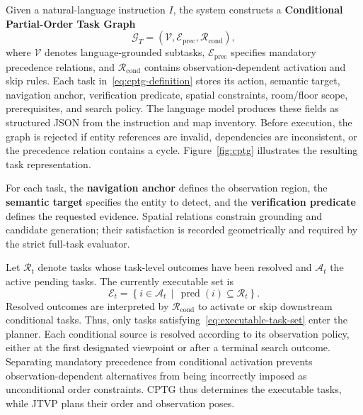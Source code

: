 \documentclass[letterpaper,10pt,journal]{IEEEtran}
\begin{document}
Given a natural-language instruction $I$, the system constructs a \textbf{Conditional Partial-Order Task Graph}
\begin{equation}
\mathcal G_T=(\mathcal V,\mathcal E_{\mathrm{prec}},\mathcal R_{\mathrm{cond}}),
\label{eq:cptg-definition}
\end{equation}
where $\mathcal V$ denotes language-grounded subtasks, $\mathcal E_{\mathrm{prec}}$ specifies mandatory precedence relations, and $\mathcal R_{\mathrm{cond}}$ contains observation-dependent activation and skip rules. Each task in~\eqref{eq:cptg-definition} stores its action, semantic target, navigation anchor, verification predicate, spatial constraints, room/floor scope, prerequisites, and search policy. The language model produces these fields as structured JSON from the instruction and map inventory. Before execution, the graph is rejected if entity references are invalid, dependencies are inconsistent, or the precedence relation contains a cycle. Figure~\ref{fig:cptg} illustrates the resulting task representation.



For each task, the \textbf{navigation anchor} defines the observation region, the \textbf{semantic target} specifies the entity to detect, and the \textbf{verification predicate} defines the requested evidence. Spatial relations constrain grounding and candidate generation; their satisfaction is recorded geometrically and required by the strict full-task evaluator.

Let $\mathcal R_t$ denote tasks whose task-level outcomes have been resolved and $\mathcal A_t$ the active pending tasks. The currently executable set is
\begin{equation}
\mathcal E_t=
\left\{i\in\mathcal A_t\,\middle|\,
\operatorname{pred}(i)\subseteq\mathcal R_t\right\}.
\label{eq:executable-task-set}
\end{equation}
Resolved outcomes are interpreted by $\mathcal R_{\mathrm{cond}}$ to activate or skip downstream conditional tasks. Thus, only tasks satisfying~\eqref{eq:executable-task-set} enter the planner. Each conditional source is resolved according to its observation policy, either at the first designated viewpoint or after a terminal search outcome. Separating mandatory precedence from conditional activation prevents observation-dependent alternatives from being incorrectly imposed as unconditional order constraints. CPTG thus determines the executable tasks, while JTVP plans their order and observation poses.
\end{document}
